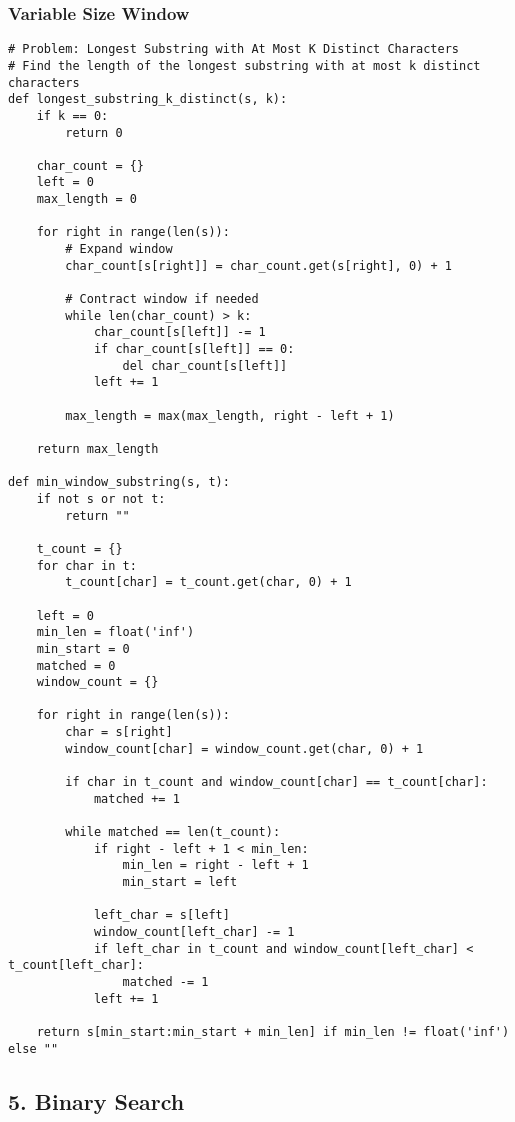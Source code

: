 \documentclass[10pt,a4paper]{article}
\begin{document}
\subsubsection{Variable Size Window}
\begin{lstlisting}
# Problem: Longest Substring with At Most K Distinct Characters
# Find the length of the longest substring with at most k distinct characters
def longest_substring_k_distinct(s, k):
    if k == 0:
        return 0

    char_count = {}
    left = 0
    max_length = 0

    for right in range(len(s)):
        # Expand window
        char_count[s[right]] = char_count.get(s[right], 0) + 1

        # Contract window if needed
        while len(char_count) > k:
            char_count[s[left]] -= 1
            if char_count[s[left]] == 0:
                del char_count[s[left]]
            left += 1

        max_length = max(max_length, right - left + 1)

    return max_length

def min_window_substring(s, t):
    if not s or not t:
        return ""

    t_count = {}
    for char in t:
        t_count[char] = t_count.get(char, 0) + 1

    left = 0
    min_len = float('inf')
    min_start = 0
    matched = 0
    window_count = {}

    for right in range(len(s)):
        char = s[right]
        window_count[char] = window_count.get(char, 0) + 1

        if char in t_count and window_count[char] == t_count[char]:
            matched += 1

        while matched == len(t_count):
            if right - left + 1 < min_len:
                min_len = right - left + 1
                min_start = left

            left_char = s[left]
            window_count[left_char] -= 1
            if left_char in t_count and window_count[left_char] < t_count[left_char]:
                matched -= 1
            left += 1

    return s[min_start:min_start + min_len] if min_len != float('inf') else ""
\end{lstlisting}

\subsection{5. Binary Search}
\end{document}
